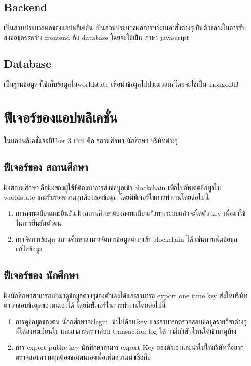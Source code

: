 \subsection{Backend}
\enskip \enskip \enskip \enskip \enskip 
เป็นส่วนประมวลผลของแอปพลิเคชั่น เป็นส่วนประมวลผลการทำงานคำสั่งต่างๆเป็นตัวกลางในการรับส่งข้อมูลระหว่าง frontend กับ database โดยจะใช้เป็น ภาษา javascript

\subsection{Database}
\enskip \enskip \enskip \enskip \enskip 
เป็นฐานข้อมูลที่ใช้เก็บข้อมูลในworldstate เพื่อนำข้อมูลไปประมวลผลโดยจะใช้เป็น mongoDB

\section{ฟีเจอร์ของแอปพลิเคชั่น}
\enskip \enskip \enskip \enskip \enskip
ในแอปพลิเคชั่นจะมีUser 3 แบบ คือ สถานศึกษา นักศึกษา บริษัทต่างๆ

\subsection{ฟีเจอร์ของ สถานศึกษา}
\enskip \enskip \enskip \enskip \enskip 
ฝั่งสถานศึกษา คือฝั่งของผู้ใช้ที่ต้องทำการส่งข้อมูลเข้า blockchain เพื่อไปอัพเดตช้อมูลใน worldstate และรับรองความถูกต้องของข้อมูล
โดยมีฟีเจอร์ในการทำงานโดยต่อไปนี้
\begin{enumerate}
  \item การลงทะเบียนและยืนยัน ฝั่งสถานศึกษาต้องลงทะเบียนกับทางระบบแล้วจะได้ตัว key เพื่อมาใช้ในการยืนยันตัวตน
  \item การจัดการข้อมูล สถานศึกษาสามารจัดการข้อมูลต่างๆเข้า blockchain ได้ เช่นการเพิ่มข้อมูล แก้ไขข้อมูล
  \end{enumerate}

\subsection{ฟีเจอร์ของ นักศึกษา}
\enskip \enskip \enskip \enskip \enskip 
ฝั่งนักศึกษาสามารถเข้ามาดูข้อมูลต่างๆของตัวเองได้และสามารถ export one time key ส่งให้บริษัทตรวจสอบข้อมูลของตนเองได้
โดยมีฟีเจอร์ในการทำงานโดยต่อไปนี้
\begin{enumerate}
  \item การดูข้อมูลของตน นักกศึกษาจะlogin เข้าไปด้วย key และสามารถตรวจสอบข้อมูลรายวิชาต่างๆ ที่ได้ลงทะเบียนไป และสามารตรวจสอบ transaction log ได้ ว่ามีบริษัทไหนได้เข้ามาดูบ้าง
  \item การ export public-key นักศึกษาสามาร export Key ของตัวเองและนำไปให้บริษัทที่อยากตรวจสอบความถูกต้องของตนเองเพื่อเพิ่มความน่าเชื่อถือ
  \end{enumerate}
